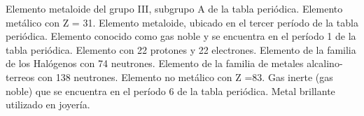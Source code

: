 \begin{minipage}{0.8\textwidth}
    \begin{choices}
        \choice Elemento metaloide del grupo III, subgrupo A de la tabla periódica.
        \choice Elemento metálico con Z = 31.
        \choice Elemento metaloide, ubicado en el tercer período de la tabla periódica.
        \choice Elemento conocido como gas noble y se encuentra en el período 1 de la tabla periódica.
        \choice Elemento con 22 protones y 22 electrones.
        \choice Elemento de la familia de los Halógenos con 74 neutrones.
        \choice Elemento de la familia de metales alcalino-terreos con 138 neutrones.
        \choice Elemento no metálico con Z =83.
        \choice Gas inerte (gas noble) que se encuentra en el período 6 de la tabla periódica.
        \choice Metal brillante utilizado en joyería.
    \end{choices}
\end{minipage}